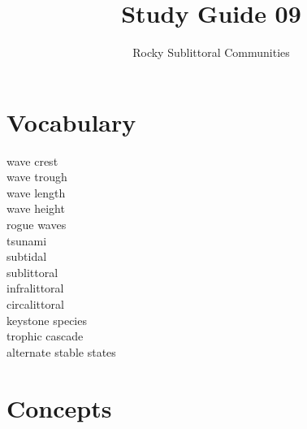 \documentclass[nofonts, letterpaper]{tufte-handout}
\title{Study Guide 09}
\author{Rocky Sublittoral Communities}
\date{} %
\begin{document}
\maketitle	%


\section{Vocabulary}
\vspace{-1\baselineskip}
\begin{multicols}{2}
wave crest\\
wave trough\\
wave length\\
wave height\\
rogue waves\\
tsunami\\
subtidal \\
sublittoral \\
infralittoral \\
circalittoral \\
keystone species \\
trophic cascade \\
alternate stable states
\end{multicols}

\section{Concepts}
\end{document}
